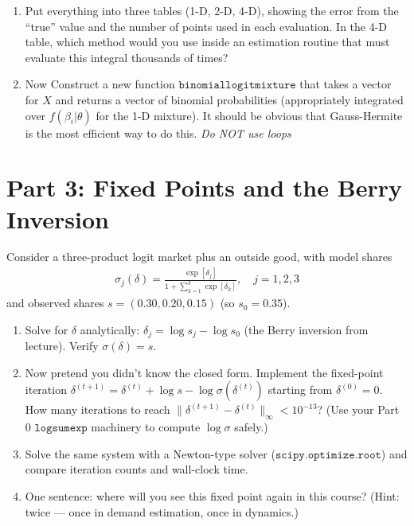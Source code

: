 \documentclass{article}
\begin{document}
\begin{enumerate}
\item Put everything into three tables (1-D, 2-D, 4-D), showing the error from the ``true'' value and the number of points used in each evaluation. In the 4-D table, which method would you use inside an estimation routine that must evaluate this integral thousands of times?
\item Now Construct a new function $\mathtt{binomiallogitmixture}$ that takes a vector for $X$ and returns a vector of binomial probabilities (appropriately integrated over $f(\beta_i | \theta)$ for the 1-D mixture). It should be obvious that Gauss-Hermite is the most efficient way to do this. \textit{Do NOT use loops}
\end{enumerate}

\section*{Part 3: Fixed Points and the Berry Inversion}
Consider a three-product logit market plus an outside good, with model shares
\begin{eqnarray*}
\sigma_j(\delta) = \frac{\exp[\delta_j]}{1+\sum_{k=1}^{3}\exp[\delta_k]}, \quad j = 1,2,3
\end{eqnarray*}
and observed shares $s = (0.30, 0.20, 0.15)$ (so $s_0 = 0.35$).
\begin{enumerate}
\item Solve for $\delta$ analytically: $\delta_j = \log s_j - \log s_0$ (the Berry inversion from lecture). Verify $\sigma(\delta) = s$.
\item Now pretend you didn't know the closed form. Implement the fixed-point iteration
$\delta^{(t+1)} = \delta^{(t)} + \log s - \log \sigma(\delta^{(t)})$
starting from $\delta^{(0)} = 0$. How many iterations to reach $\|\delta^{(t+1)}-\delta^{(t)}\|_{\infty} < 10^{-13}$? (Use your Part 0 $\mathtt{logsumexp}$ machinery to compute $\log \sigma$ safely.)
\item Solve the same system with a Newton-type solver ($\mathtt{scipy.optimize.root}$) and compare iteration counts and wall-clock time.
\item One sentence: where will you see this fixed point again in this course? (Hint: twice --- once in demand estimation, once in dynamics.)
\end{enumerate}
\end{document}
